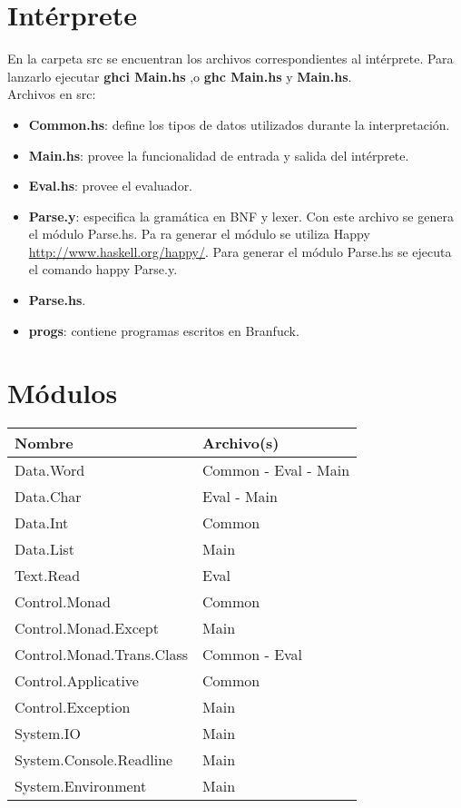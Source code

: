 \documentclass[a4paper, 12pt]{article}
\begin{document}
\section*{Intérprete}


En la carpeta src se encuentran los archivos correspondientes al intérprete. Para lanzarlo
ejecutar \textbf{ghci Main.hs} ,o \textbf{ghc Main.hs} y  \textbf{Main.hs}. \\
Archivos en src:
\begin{itemize}
	\item \textbf{Common.hs}: define los tipos de datos utilizados durante la interpretación.
	\item \textbf{Main.hs}: provee la funcionalidad de entrada y salida del intérprete.
	\item \textbf{Eval.hs}: provee el evaluador.
	\item \textbf{Parse.y}: especifica la gramática en BNF y lexer. Con este archivo se genera el módulo Parse.hs. Pa
	ra generar el módulo se utiliza Happy \url{http://www.haskell.org/happy/}. Para generar el módulo Parse.hs
	se ejecuta el comando happy Parse.y.
	\item \textbf{Parse.hs}.
	\item \textbf{progs}: contiene programas escritos en Branfuck.
\end{itemize}




\section*{Módulos}


\begin{center}
\begin{tabular}{ |l|l| } 
 \hline
 Nombre & Archivo(s) \\
 \hline
 Data.Word & Common - Eval - Main \\
 Data.Char & Eval - Main \\
 Data.Int & Common \\
 Data.List & Main \\
 Text.Read & Eval \\
 Control.Monad & Common \\
 Control.Monad.Except & Main \\ 
 Control.Monad.Trans.Class & Common - Eval \\
 Control.Applicative & Common \\
 Control.Exception & Main \\ 
 System.IO & Main \\ 
 System.Console.Readline & Main \\ 
 System.Environment & Main \\ 
 \hline
\end{tabular}
\end{center}

\newpage
\nocite{*}
\printbibliography[title={Referencias}]
\end{document}
